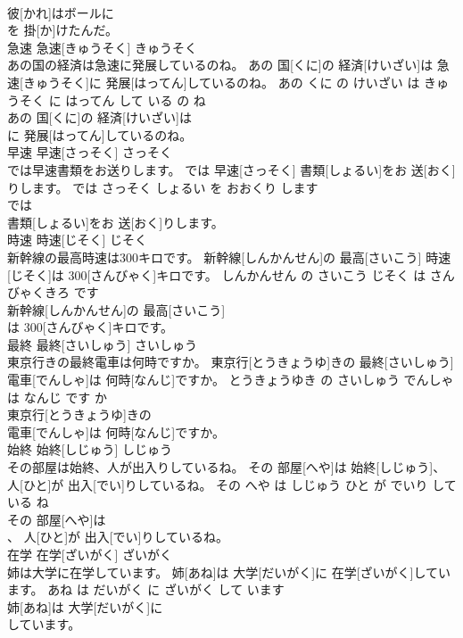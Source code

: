 \documentclass[8pt]{extreport}
\begin{document}
\begin{CJK}{UTF8}{min}
\\	彼[かれ]はボールに
\\	を 掛[か]けたんだ。			
\\	急速	急速[きゅうそく]	きゅうそく	
\\	あの国の経済は急速に発展しているのね。	あの 国[くに]の 経済[けいざい]は 急速[きゅうそく]に 発展[はってん]しているのね。	あの くに の けいざい は きゅうそく に はってん して いる の ね	
\\	あの 国[くに]の 経済[けいざい]は
\\	に 発展[はってん]しているのね。			
\\	早速	早速[さっそく]	さっそく	
\\	では早速書類をお送りします。	では 早速[さっそく] 書類[しょるい]をお 送[おく]りします。	では さっそく しょるい を おおくり します	
\\	では
\\	書類[しょるい]をお 送[おく]りします。			
\\	時速	時速[じそく]	じそく	
\\	新幹線の最高時速は300キロです。	新幹線[しんかんせん]の 最高[さいこう] 時速[じそく]は 300[さんびゃく]キロです。	しんかんせん の さいこう じそく は さんびゃくきろ です	
\\	新幹線[しんかんせん]の 最高[さいこう]
\\	は 300[さんびゃく]キロです。			
\\	最終	最終[さいしゅう]	さいしゅう	
\\	東京行きの最終電車は何時ですか。	東京行[とうきょうゆ]きの 最終[さいしゅう] 電車[でんしゃ]は 何時[なんじ]ですか。	とうきょうゆき の さいしゅう でんしゃ は なんじ です か	
\\	東京行[とうきょうゆ]きの
\\	電車[でんしゃ]は 何時[なんじ]ですか。			
\\	始終	始終[しじゅう]	しじゅう	
\\	その部屋は始終、人が出入りしているね。	その 部屋[へや]は 始終[しじゅう]、 人[ひと]が 出入[でい]りしているね。	その へや は しじゅう ひと が でいり して いる ね	
\\	その 部屋[へや]は
\\	、 人[ひと]が 出入[でい]りしているね。			
\\	在学	在学[ざいがく]	ざいがく	
\\	姉は大学に在学しています。	姉[あね]は 大学[だいがく]に 在学[ざいがく]しています。	あね は だいがく に ざいがく して います	
\\	姉[あね]は 大学[だいがく]に
\\	しています。			

\end{CJK}
\end{document}
